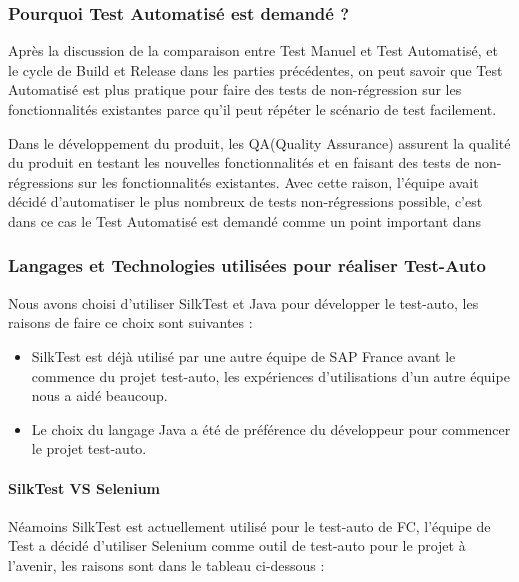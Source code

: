 	\subsubsection{Pourquoi Test Automatisé est demandé ?}
	Après la discussion de la comparaison entre Test Manuel et Test Automatisé, et le cycle de Build et Release dans les parties précédentes, on peut savoir que Test Automatisé est plus pratique pour faire des tests de non-régression sur les fonctionnalités existantes parce qu'il peut répéter le scénario de test facilement.
	
	\par Dans le développement du produit, les QA(Quality Assurance) assurent la qualité du produit en testant les nouvelles fonctionnalités et en faisant des tests de non-régressions sur les fonctionnalités existantes. Avec cette raison, l'équipe avait décidé d'automatiser le plus nombreux de tests non-régressions possible, c'est dans ce cas le Test Automatisé est demandé comme un point important dans 

\subsubsection{Langages et Technologies utilisées pour réaliser Test-Auto}
    Nous avons choisi d'utiliser SilkTest et Java pour développer le test-auto, les raisons de faire ce choix sont suivantes : 
    \begin{itemize}
        \item SilkTest est déjà utilisé par une autre équipe de SAP France avant le commence du projet test-auto, les expériences d'utilisations d'un autre équipe nous a aidé beaucoup.
        \item Le choix du langage Java a été de préférence du développeur pour commencer le projet test-auto.
    \end{itemize}
    
    \paragraph{SilkTest VS Selenium}
    Néamoins SilkTest est actuellement utilisé pour le test-auto de FC, l'équipe de Test a décidé d'utiliser Selenium comme outil de test-auto pour le projet à l'avenir, les raisons sont dans le tableau ci-dessous : 
    
